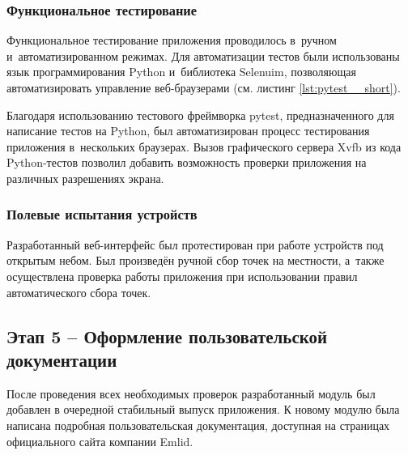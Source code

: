 \documentclass[pta]{../../../../scs-iam}
\begin{document}
\subsubsection{Функциональное тестирование}

Функциональное тестирование приложения проводилось в~ручном и~автоматизированном режимах. Для автоматизации тестов были использованы язык программирования Python и~библиотека Selenuim, позволяющая автоматизировать управление веб-браузерами (см. листинг \ref{lst:pytest__short}).

Благодаря использованию тестового фреймворка pytest, предназначенного для написание тестов на Python, был автоматизирован процесс тестирования приложения в~нескольких браузерах. Вызов графического сервера Xvfb из кода Python-тестов позволил добавить возможность проверки приложения на различных разрешениях экрана.



\subsubsection{Полевые испытания устройств}

Разработанный веб-интерфейс был протестирован при работе устройств под открытым небом. Был произведён ручной сбор точек на местности, а~также осуществлена проверка работы приложения при использовании правил автоматического сбора точек.

\subsection{Этап 5 -- Оформление пользовательской документации}

После проведения всех необходимых проверок разработанный модуль был добавлен в очередной стабильный выпуск приложения. К новому модулю была написана подробная пользовательская документация, доступная на страницах официального сайта компании Emlid.
\end{document}
